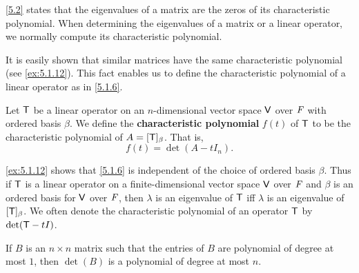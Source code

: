 \begin{note}
  \cref{5.2} states that the eigenvalues of a matrix are the zeros of its characteristic polynomial.
  When determining the eigenvalues of a matrix or a linear operator, we normally compute its characteristic polynomial.
\end{note}

\begin{note}
  It is easily shown that similar matrices have the same characteristic polynomial (see \cref{ex:5.1.12}).
  This fact enables us to define the characteristic polynomial of a linear operator as in \cref{5.1.6}.
\end{note}

\begin{defn}\label{5.1.6}
  Let \(\mathsf{T}\) be a linear operator on an \(n\)-dimensional vector space \(\mathsf{V}\) over \(\mathit{F}\) with ordered basis \(\beta\).
  We define the \textbf{characteristic polynomial} \(f(t)\) of \(\mathsf{T}\) to be the characteristic polynomial of \(A = [\mathsf{T}]_{\beta}\).
  That is,
  \[
    f(t) = \det(A - t I_n).
  \]
\end{defn}

\begin{note}
  \cref{ex:5.1.12} shows that \cref{5.1.6} is independent of the choice of ordered basis \(\beta\).
  Thus if \(\mathsf{T}\) is a linear operator on a finite-dimensional vector space \(\mathsf{V}\) over \(\mathit{F}\) and \(\beta\) is an ordered basis for \(\mathsf{V}\) over \(\mathit{F}\), then \(\lambda\) is an eigenvalue of \(\mathsf{T}\) iff \(\lambda\) is an eigenvalue of \([\mathsf{T}]_{\beta}\).
  We often denote the characteristic polynomial of an operator \(\mathsf{T}\) by \(\det(\mathsf{T} - tI)\).
\end{note}

\begin{lem}\label{5.1.7}
  If \(B\) is an \(n \times n\) matrix such that the entries of \(B\) are polynomial of degree at most \(1\), then \(\det(B)\) is a polynomial of degree at most \(n\).
\end{lem}

